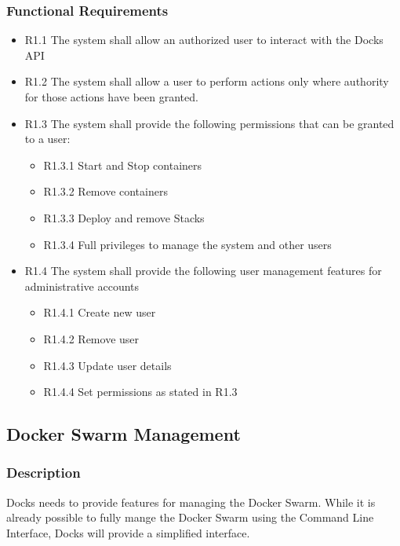 \documentclass[]{article}
\begin{document}
\subsubsection{Functional Requirements}

\begin{itemize}
	\item R1.1 The system shall allow an authorized user to interact with the Docks API
	\item R1.2 The system shall allow a user to perform actions only where authority for those actions have been granted.
	\item R1.3 The system shall provide the following permissions that can be granted to a user:
		\begin{itemize}
			\item R1.3.1 Start and Stop containers
			\item R1.3.2 Remove containers
			\item R1.3.3 Deploy and remove Stacks
			\item R1.3.4 Full privileges to manage the system and other users 
		\end{itemize}
	\item R1.4 The system shall provide the following user management features for administrative accounts
		\begin{itemize}
			\item R1.4.1 Create new user
			\item R1.4.2 Remove user
			\item R1.4.3 Update user details
			\item R1.4.4 Set permissions as stated in R1.3
		\end{itemize}
\end{itemize}

\subsection{Docker Swarm Management}
\subsubsection{Description}
Docks needs to provide features for managing the Docker Swarm. While it is already possible to fully mange the Docker Swarm using the Command Line Interface, Docks will provide a simplified interface.
\end{document}
